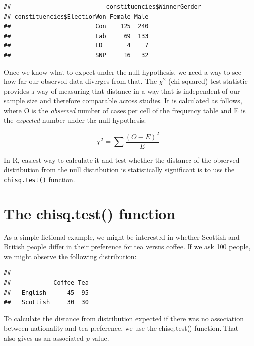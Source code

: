 \documentclass[
]{book}
\newenvironment{Shaded}{\begin{snugshade}}{\end{snugshade}}
\newcommand{\KeywordTok}[1]{\textcolor[rgb]{0.13,0.29,0.53}{\textbf{#1}}}
\newcommand{\NormalTok}[1]{#1}
\newcommand{\OperatorTok}[1]{\textcolor[rgb]{0.81,0.36,0.00}{\textbf{#1}}}
\begin{document}
\begin{verbatim}
##                           constituencies$WinnerGender
## constituencies$ElectionWon Female Male
##                        Con    125  240
##                        Lab     69  133
##                        LD       4    7
##                        SNP     16   32
\end{verbatim}

Once we know what to expect under the null-hypothesis, we need a way to see how far our observed data diverges from that. The \(\chi^2\) (chi-squared) test statistic provides a way of measuring that distance in a way that is independent of our sample size and therefore comparable across studies. It is calculated as follows, where O is the \emph{observed} number of cases per cell of the frequency table and E is the \emph{expected} number under the null-hypothesis:

\[\chi^2=\sum\frac{(O-E)^2}E\]

In R, easiest way to calculate it and test whether the distance of the observed distribution from the null distribution is statistically significant is to use the \texttt{chisq.test()} function.

\hypertarget{the-chisq.test-function}{%
\section{The chisq.test() function}\label{the-chisq.test-function}}

As a simple fictional example, we might be interested in whether Scottish and British people differ in their preference for tea versus coffee. If we ask 100 people, we might observe the following distribution:

\begin{Shaded}
\end{Shaded}

\begin{verbatim}
##           
##            Coffee Tea
##   English      45  95
##   Scottish     30  30
\end{verbatim}

To calculate the distance from distribution expected if there was no association between nationality and tea preference, we use the chisq.test() function. That also gives us an associated \emph{p}-value.
\end{document}
